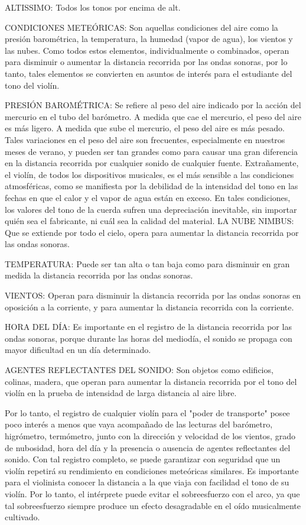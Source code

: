 \documentclass[12pt]{book}
\begin{document}
ALTISSIMO: Todos los tonos por encima de alt.

CONDICIONES METEÓRICAS: Son aquellas condiciones del aire como la presión barométrica, la temperatura, la humedad (vapor de agua), los vientos y las nubes. Como todos estos elementos, individualmente o combinados, operan para disminuir o aumentar la distancia recorrida por las ondas sonoras, por lo tanto, tales elementos se convierten en asuntos de interés para el estudiante del tono del violín.

PRESIÓN BAROMÉTRICA: Se refiere al peso del aire indicado por la acción del mercurio en el tubo del barómetro. A medida que cae el mercurio, el peso del aire es más ligero. A medida que sube el mercurio, el peso del aire es más pesado. Tales variaciones en el peso del aire son frecuentes, especialmente en nuestros meses de verano, y pueden ser tan grandes como para causar una gran diferencia en la distancia recorrida por cualquier sonido de cualquier fuente. Extrañamente, el violín, de todos los dispositivos musicales, es el más sensible a las condiciones atmosféricas, como se manifiesta por la debilidad de la intensidad del tono en las fechas en que el calor y el vapor de agua están en exceso. En tales condiciones, los valores del tono de la cuerda sufren una depreciación inevitable, sin importar quién sea el fabricante, ni cuál sea la calidad del material.
LA NUBE NIMBUS: Que se extiende por todo el cielo, opera para aumentar la distancia recorrida por las ondas sonoras.

TEMPERATURA: Puede ser tan alta o tan baja como para disminuir en gran medida la distancia recorrida por las ondas sonoras.

VIENTOS: Operan para disminuir la distancia recorrida por las ondas sonoras en oposición a la corriente, y para aumentar la distancia recorrida con la corriente.

HORA DEL DÍA: Es importante en el registro de la distancia recorrida por las ondas sonoras, porque durante las horas del mediodía, el sonido se propaga con mayor dificultad en un día determinado.

AGENTES REFLECTANTES DEL SONIDO: Son objetos como edificios, colinas, madera, que operan para aumentar la distancia recorrida por el tono del violín en la prueba de intensidad de larga distancia al aire libre.

Por lo tanto, el registro de cualquier violín para el "poder de transporte" posee poco interés a menos que vaya acompañado de las lecturas del barómetro, higrómetro, termómetro, junto con la dirección y velocidad de los vientos, grado de nubosidad, hora del día y la presencia o ausencia de agentes reflectantes del sonido. Con tal registro completo, se puede garantizar con seguridad que un violín repetirá su rendimiento en condiciones meteóricas similares. Es importante para el violinista conocer la distancia a la que viaja con facilidad el tono de su violín. Por lo tanto, el intérprete puede evitar el sobreesfuerzo con el arco, ya que tal sobreesfuerzo siempre produce un efecto desagradable en el oído musicalmente cultivado.
\end{document}
